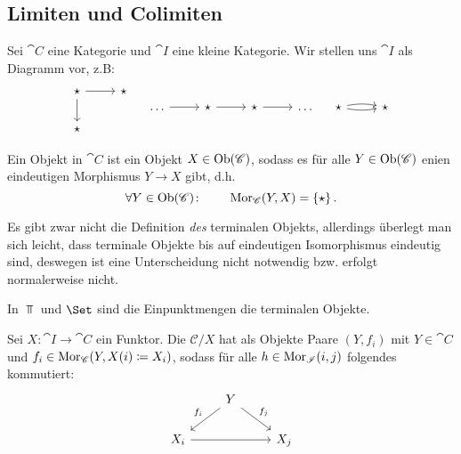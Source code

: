 \subsection{Limiten und Colimiten}
Sei $\cat{C}$ eine Kategorie und $\cat{I}$ eine kleine Kategorie. Wir stellen uns $\cat{I}$ als Diagramm vor, z.B:
\[
\begin{tikzcd}
    \star \ar{r} \ar{d} & \star \\
    \star
\end{tikzcd} 
\quad
\begin{tikzcd}
    \ldots \ar{r} & \star \ar{r} & \star \ar{r} &\ldots
\end{tikzcd}
\quad
\begin{tikzcd}
    \star \ar[bend left = 10]{r} \ar[bend right = 10]{r} & \star
\end{tikzcd}
\]
\begin{definition}
    Ein  Objekt in $\cat{C}$ ist ein Objekt $X\in \operatorname{Ob}(\mathscr{C})$, sodass es für alle $Y\in \operatorname{Ob}(\mathscr{C})$ enien eindeutigen Morphismus $Y \to  X$ gibt, d.h.
     \[
         \forall Y\in \operatorname{Ob}(\mathscr{C})\colon  \qquad \operatorname{Mor}_{\mathscr{C}}(Y,X) = \left \{\star\right\} 
    .\] 
\end{definition}
\begin{oral}
    Es gibt zwar nicht die Definition \textit{des} terminalen Objekts, allerdings überlegt man sich leicht, dass terminale Objekte bis auf eindeutigen Isomorphismus eindeutig sind, deswegen ist eine Unterscheidung nicht notwendig bzw. erfolgt normalerweise nicht.
\end{oral}

\begin{example}
    In $\Top$ und  $\Set$ sind die Einpunktmengen die terminalen Objekte.
\end{example}

\begin{definition}[Kegelkategorie]\label{def:kegelkategorie}
    Sei $X: \cat{I} \to  \cat{C}$ ein Funktor. Die  $\mathcal{C} / X$ hat als Objekte Paare $(Y,f_i)$ mit  $Y\in \cat{C}$ und $f_i \in \operatorname{Mor}_{\mathscr{C}}(Y,X(i) \coloneqq  X_i)$, sodass für alle $h\in \operatorname{Mor}_{\mathscr{I}}(i,j)$ folgendes kommutiert:
\[
\begin{tikzcd}
    & Y \ar[swap]{dl}{f_i} \ar{dr}{f_j} \\
    X_i \ar[swap]{rr} & & X_j
\end{tikzcd}
\]
\end{definition}

